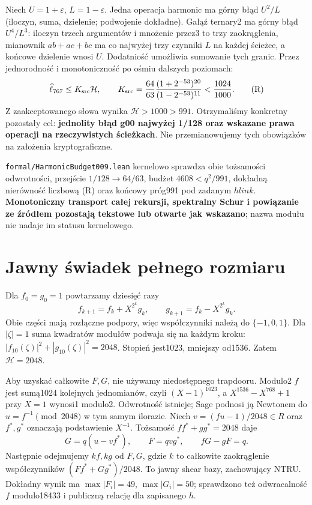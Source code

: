 \documentclass[11pt,a4paper]{article}
\newcommand{\code}[1]{\nolinkurl{#1}}
\newcommand{\HH}{\mathcal H}\newtheorem{theorem}{Twierdzenie}
\begin{document}
Niech $U=1+\varepsilon$, $L=1-\varepsilon$.
Jedna operacja harmonic ma górny błąd $U^2/L$ (iloczyn, suma, dzielenie;
podwojenie dokładne). Gałąź ternary2 ma górny błąd $U^4/L^3$:
iloczyn trzech argumentów i mnożenie przez3 to trzy zaokrąglenia,
mianownik $ab+ac+bc$ ma co najwyżej trzy czynniki $L$ na każdej ścieżce,
a końcowe dzielenie wnosi $U$. Dodatniość umożliwia sumowanie tych granic.
Przez jednorodność i monotoniczność po ośmiu dalszych poziomach:
\[
 \widehat\ell_{767}\le
 K_{\rm src}\HH,\qquad
 K_{\rm src}=\frac{64}{63}\frac{(1+2^{-53})^{20}}{(1-2^{-53})^{11}}
 <\frac{1024}{1000}.                                      \tag{R}
\]
Z zaakceptowanego słowa wynika $\HH>1000>991$.
Otrzymaliśmy konkretny pozostały cel: \textbf{jednolity błąd g00 najwyżej
1/128 oraz wskazane prawa operacji na rzeczywistych ścieżkach}.
Nie przemianowujemy tych obowiązków na założenia kryptograficzne.

\code{formal/HarmonicBudget009.lean} kernelowo sprawdza obie tożsamości
odwrotności, przejście $1/128\to64/63$, budżet $4608<q^2/991$,
dokładną nierówność liczbową (R) oraz końcowy próg991 pod zadanym $hlink$.
\textbf{Monotoniczny transport całej rekursji, spektralny Schur i powiązanie
ze źródłem pozostają tekstowe lub otwarte jak wskazano}; nazwa modułu
nie nadaje im statusu kernelowego.

\section{Jawny świadek pełnego rozmiaru}
Dla $f_0=g_0=1$ powtarzamy dziesięć razy
\[
 f_{k+1}=f_k+X^{2^k}g_k,\qquad g_{k+1}=f_k-X^{2^k}g_k.
\]
Obie części mają rozłączne podpory, więc współczynniki należą do
$\{-1,0,1\}$. Dla $|\zeta|=1$ suma kwadratów modułów podwaja się
na każdym kroku: $|f_{10}(\zeta)|^2+|g_{10}(\zeta)|^2=2048$.
Stopień jest1023, mniejszy od1536. Zatem $\HH=2048$.

Aby uzyskać całkowite $F,G$, nie używamy niedostępnego trapdooru.
Modulo2 $f$ jest sumą1024 kolejnych jednomianów, czyli $(X-1)^{1023}$,
a $X^{1536}-X^{768}+1$ przy $X=1$ wynosi1 modulo2. Odwrotność istnieje;
Sage podnosi ją Newtonem do $u=f^{-1}\pmod{2048}$ w tym samym ilorazie.
Niech $v=(fu-1)/2048\in R$ oraz $f^*,g^*$ oznaczają podstawienie $X^{-1}$.
Tożsamość $ff^*+gg^*=2048$ daje
\[
 G=q(u-vf^*),\qquad F=qvg^*,\qquad fG-gF=q.
\]
Następnie odejmujemy $kf,kg$ od $F,G$, gdzie $k$ to całkowite zaokrąglenie
współczynników $(Ff^*+Gg^*)/2048$. To jawny shear bazy, zachowujący NTRU.
Dokładny wynik ma $\max|F_i|=49$, $\max|G_i|=50$; sprawdzono też odwracalność
$f$ modulo18433 i publiczną relację dla zapisanego $h$.
\end{document}
